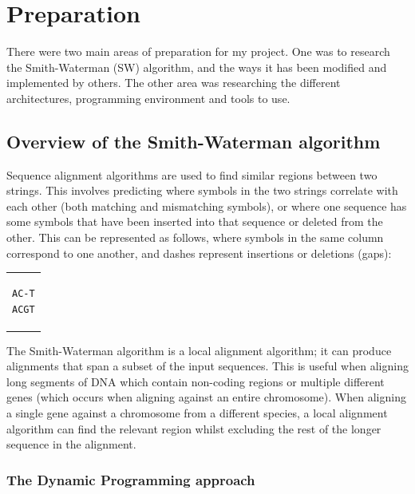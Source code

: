 
\chapter{Preparation}

There were two main areas of preparation for my project. One was to research the Smith-Waterman (SW) algorithm, and the ways it has been modified and implemented by others.
The other area was researching the different architectures, programming environment and tools to use.

\section{Overview of the Smith-Waterman algorithm}
\label{sec:SW_Overview}
Sequence alignment algorithms are used to find similar regions between two strings.
This involves predicting where symbols in the two strings correlate with each other (both matching and mismatching symbols), or where one sequence has some symbols that have been inserted into that sequence or deleted from the other.
This can be represented as follows, where symbols in the same column correspond to one another, and dashes represent insertions or deletions (gaps):
\begin{center}
\begin{tabular}{c}
\begin{lstlisting}[basicstyle=\ttfamily\linespread{0.8}]
AC-T
ACGT
\end{lstlisting}
\end{tabular}
\end{center}

The Smith-Waterman algorithm \cite{SW_Original} is a local alignment algorithm; it can produce alignments that span a subset of the input sequences.
This is useful when aligning long segments of DNA which contain non-coding regions or multiple different genes (which occurs when aligning against an entire chromosome).
When aligning a single gene against a chromosome from a different species, a local alignment algorithm can find the relevant region whilst excluding the rest of the longer sequence in the alignment.

\subsection{The Dynamic Programming approach}
\label{sec:SW_DP}

